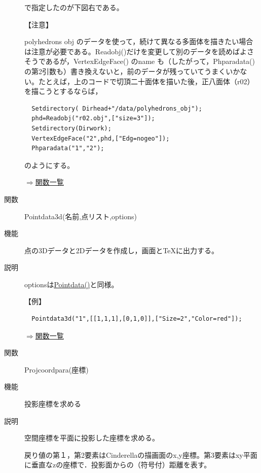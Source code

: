\documentclass[papersize,a4paper,12pt,uplatex]{jsarticle}
\begin{document}
\begin{description}
で指定したのが下図右である。

 \begin{center}     \end{center}

【注意】

  polyhedrons obj のデータを使って，続けて異なる多面体を描きたい場合は注意が必要である。Readobj()だけを変更して別のデータを読めばよさそうであるが，VertexEdgeFace() のname も（したがって，Phparadata()の第2引数も）書き換えないと，前のデータが残っていてうまくいかない。たとえば，上のコードで切頂二十面体を描いた後，正八面体（r02）を描こうとするならば，
\begin{verbatim}
  Setdirectory( Dirhead+"/data/polyhedrons_obj");
  phd=Readobj("r02.obj",["size=3"]);
  Setdirectory(Dirwork);
  VertexEdgeFace("2",phd,["Edg=nogeo"]);
  Phparadata("1","2");
\end{verbatim}
  のようにする。
  

\begin{flushright} \hyperlink{functionlist}{$\Rightarrow$関数一覧}\end{flushright}

\hypertarget{pointdata3d}{}
\item[関数]  Pointdata3d(名前,点リスト,options)
\item[機能]  点の3Dデータと2Dデータを作成し，画面と\TeX に出力する。
\item[説明]  optionsは\hyperlink{pointdata}{Pointdata()}と同様。
\vspace{\baselineskip}

【例】
\begin{verbatim}
  Pointdata3d("1",[[1,1,1],[0,1,0]],["Size=2","Color=red"]);
\end{verbatim}
\vspace{\baselineskip}

\begin{flushright} \hyperlink{functionlist}{$\Rightarrow$関数一覧}\end{flushright}

\hypertarget{projcoordpara}{}
\item[関数]  Projcoordpara(座標)
\item[機能]  投影座標を求める
\item[説明]  空間座標を平面に投影した座標を求める。

戻り値の第１，第2要素はCinderellaの描画面のx,y座標。第3要素はxy平面に垂直なzの座標で．投影面からの（符号付）距離を表す。


\end{description}
\end{document}
